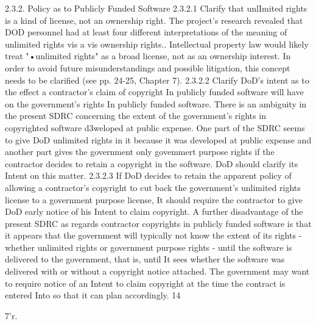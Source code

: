 \documentclass[12pt]{article}
\begin{document}
2.3.2. Policy as to Publicly Funded Software
2.3.2.1 Clarify that unlImited rights is a kind of license, not an ownership right.
The project's research revealed that DOD personnel had at least four different interpretations of the
meaning of unlimited rights vis a vis ownership rights.. Intellectual property law would likely treat
"•unlimited rights" as a broad license, not as an ownership interest. In order to avoid future misunderstandings and possible litigation, this concept needs to be clarified (see pp. 24-25, Chapter 7).
2.3.2.2 Clarify DoD's intent as to the effect a contractor's claim of copyright In publicly
funded software will have on the government's rights In publicly funded software.
There is an ambiguity in the present SDRC concerning the extent of the government's rights in
copyrighted software d3weloped at public expense. One part of the SDRC seems to give DoD unlimited rights in it because it was developed at public expense and another part gives the government
only govemmert purpose rights if the contractor decides to retain a copyright in the software. DoD
should clarify its Intent on this matter.
2.3.2.3 If DoD decides to retain the apparent policy of allowing a contractor's copyright to cut
back the government's unlimited rights license to a government purpose license, It should
require the contractor to give DoD early notice of his Intent to claim copyright.
A further disadvantage of the present SDRC as regards contractor copyrights in publicly funded
software is that it appears that the government will typically not know the extent of its rights - whether
unlimited rights or government purpose rights - until the software is delivered to the government, that
is, until It sees whether the software was delivered with or without a copyright notice attached. The
government may want to require notice of an Intent to claim copyright at the time the contract is
entered Into so that it can plan accordingly.
14

7'r.
\end{document}
